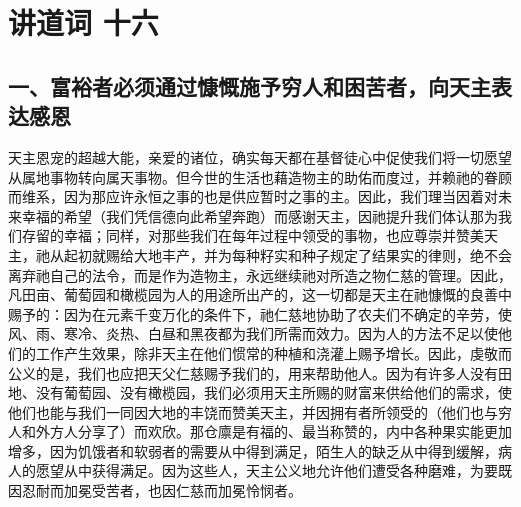


\section{讲道词 十六}

\par


\subsection{一、富裕者必须通过慷慨施予穷人和困苦者，向天主表达感恩}

天主恩宠的超越大能，亲爱的诸位，确实每天都在基督徒心中促使我们将一切愿望从属地事物转向属天事物。但今世的生活也藉造物主的助佑而度过，并赖祂的眷顾而维系，因为那应许永恒之事的也是供应暂时之事的主。因此，我们理当因着对未来幸福的希望（我们凭信德向此希望奔跑）而感谢天主，因祂提升我们体认那为我们存留的幸福；同样，对那些我们在每年过程中领受的事物，也应尊崇并赞美天主，祂从起初就赐给大地丰产，并为每种籽实和种子规定了结果实的律则，绝不会离弃祂自己的法令，而是作为造物主，永远继续祂对所造之物仁慈的管理。因此，凡田亩、葡萄园和橄榄园为人的用途所出产的，这一切都是天主在祂慷慨的良善中赐予的：因为在元素千变万化的条件下，祂仁慈地协助了农夫们不确定的辛劳，使风、雨、寒冷、炎热、白昼和黑夜都为我们所需而效力。因为人的方法不足以使他们的工作产生效果，除非天主在他们惯常的种植和浇灌上赐予增长。因此，虔敬而公义的是，我们也应把天父仁慈赐予我们的，用来帮助他人。因为有许多人没有田地、没有葡萄园、没有橄榄园，我们必须用天主所赐的财富来供给他们的需求，使他们也能与我们一同因大地的丰饶而赞美天主，并因拥有者所领受的（他们也与穷人和外方人分享了）而欢欣。那仓廪是有福的、最当称赞的，内中各种果实能更加增多，因为饥饿者和软弱者的需要从中得到满足，陌生人的缺乏从中得到缓解，病人的愿望从中获得满足。因为这些人，天主公义地允许他们遭受各种磨难，为要既因忍耐而加冕受苦者，也因仁慈而加冕怜悯者。\par

